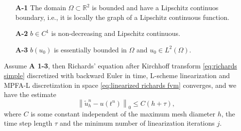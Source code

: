 \documentclass[../Main/main.tex]{subfiles}
\begin{document}
	\begin{itemize}
		\item[\textbf{A-1}] The domain $\Omega\subset \mathbb{R}^2$ is bounded and have a Lipschitz continuos boundary, i.e., it is locally the graph of a Lipschitz continuous function.
		\item[\textbf{A-2}] $b\in C^1$ is non-decreasing and Lipschitz continuous.
		\item[\textbf{A-3}] $b(u_0)$ is essentially bounded in $\Omega$ and $u_0 \in L^2(\Omega)$.
	\end{itemize}
	\begin{theorem}
		Assume \textbf{A 1-3}, then
		Richards' equation after Kirchhoff transform \eqref{eq:richards simple} discretized with backward Euler in time, L-scheme linearization and MPFA-L discretization in space \eqref{eq:linearized richards fvm} converges, and we have the estimate
		\begin{equation}\label{eq:richards_estimate}
			\left \|\tilde{u}_h^{n}-u(t^n)\right \|_0 \leq C (h+\tau),
		\end{equation}
		where $C$ is some constant independent of the maximum mesh diameter $h$, the time step length $\tau$ and the minimum number of linearization iterations $j$.
	\end{theorem}
\end{document}
